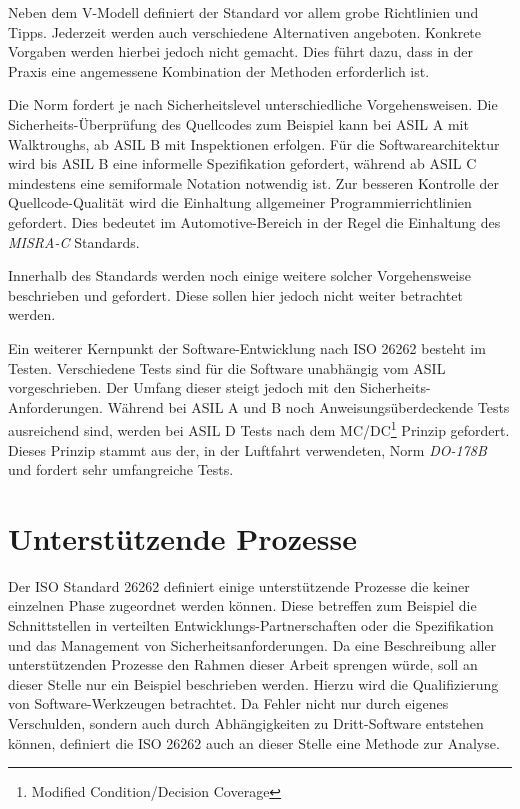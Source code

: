 \documentclass[a4paper,DIV=calc,ngerman]{scrartcl}
\begin{document}
Neben dem V-Modell definiert der Standard vor allem grobe Richtlinien und Tipps. Jederzeit werden auch verschiedene Alternativen angeboten. Konkrete Vorgaben werden hierbei jedoch nicht gemacht. Dies führt dazu, dass in der Praxis eine angemessene Kombination der Methoden erforderlich ist. 

Die Norm fordert je nach Sicherheitslevel unterschiedliche Vorgehensweisen. Die Sicherheits-Überprüfung des Quellcodes zum Beispiel kann bei ASIL A mit Walktroughs, ab ASIL B mit Inspektionen erfolgen. Für die Softwarearchitektur wird bis ASIL B eine informelle Spezifikation gefordert, während ab ASIL C mindestens eine semiformale Notation notwendig ist. Zur besseren Kontrolle der Quellcode-Qualität wird die Einhaltung allgemeiner Programmierrichtlinien gefordert. Dies bedeutet im Automotive-Bereich in der Regel die Einhaltung des \emph{MISRA-C} Standards. 

Innerhalb des Standards werden noch einige weitere solcher Vorgehensweise beschrieben und gefordert. Diese sollen hier jedoch nicht weiter betrachtet werden. 

Ein weiterer Kernpunkt der Software-Entwicklung nach ISO 26262 besteht im Testen. Verschiedene Tests sind für die Software unabhängig vom ASIL vorgeschrieben. Der Umfang dieser steigt jedoch mit den Sicherheits-Anforderungen. Während bei ASIL A und B noch Anweisungsüberdeckende Tests ausreichend sind, werden bei ASIL D Tests nach dem MC/DC\footnote{Modified Condition/Decision Coverage} Prinzip gefordert. Dieses Prinzip stammt aus der, in der Luftfahrt verwendeten, Norm \emph{DO-178B} und fordert sehr umfangreiche Tests.






\section{Unterstützende Prozesse}
\label{sec:prozesse}
Der ISO Standard 26262 definiert einige unterstützende Prozesse die keiner einzelnen Phase zugeordnet werden können. Diese betreffen zum Beispiel die Schnittstellen in verteilten Entwicklungs-Partnerschaften oder die Spezifikation und das Management von Sicherheitsanforderungen. Da eine Beschreibung aller unterstützenden Prozesse den Rahmen dieser Arbeit sprengen würde, soll an dieser Stelle nur ein Beispiel beschrieben werden. Hierzu wird die Qualifizierung von Software-Werkzeugen betrachtet. Da Fehler nicht nur durch eigenes Verschulden, sondern auch durch Abhängigkeiten zu Dritt-Software entstehen können, definiert die ISO 26262 auch an dieser Stelle eine Methode zur Analyse.
\end{document}
